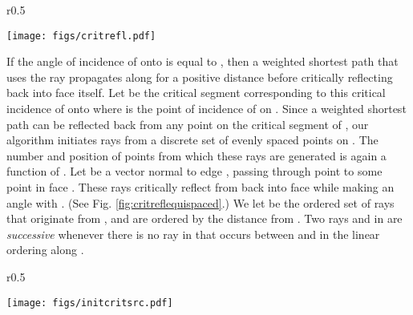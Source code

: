 \documentclass[11pt]{article}
\begin{document}
	\begin{wrapfigure}{r}{0.5\textwidth}
	\centering
	\begin{minipage}[t]{\linewidth}
	\centering
	\texttt{[image: figs/critrefl.pdf]}
	\vspace{-0.15in}
	\caption{\footnotesize Illustrating critical reflection}
	\label{fig:critreflequispaced}
	\end{minipage}
	\end{wrapfigure}

If the angle of incidence of  onto  is equal to , then a weighted shortest path that uses the ray  propagates along  for a positive distance before critically reflecting back into face  itself. 
Let  be the critical segment corresponding to this critical incidence of  onto  where  is the point of incidence of  on .
Since a weighted shortest path can be reflected back from any point on the critical segment  of , 
our algorithm initiates rays from a discrete set of evenly spaced points on .
The number and position of points from which these rays are generated is again a function of .
Let  be a vector normal to edge , passing through point  to some point in face .
These rays critically reflect from  back into face  while making an angle  with . 
(See Fig. \ref{fig:critreflequispaced}.)
We let  be the ordered set of rays that originate from , and are ordered by the distance from . 
Two rays  and  in  are {\it successive} whenever there is no ray in  that occurs between  and  in the linear ordering along .

	\begin{wrapfigure}{r}{0.5\textwidth}
	\centering
	\begin{minipage}[t]{\linewidth}
	\centering
	\texttt{[image: figs/initcritsrc.pdf]}
	\caption{\footnotesize Illustrating rays initiated from a critical source  and the corresponding sibling pair }
	\label{fig:initcritsrc}
	\end{minipage}
	\end{wrapfigure}
\end{document}
